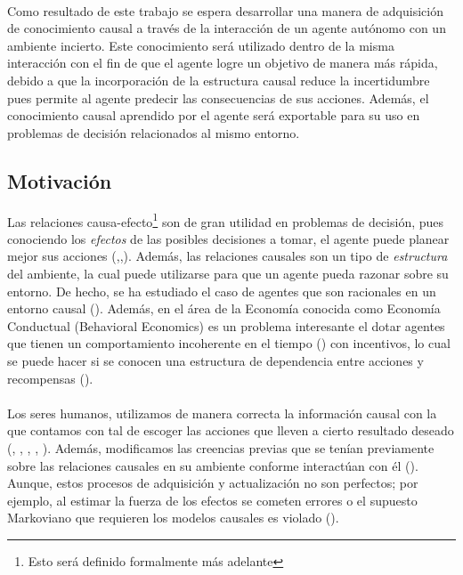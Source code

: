 \documentclass[11pt]{article}
\theoremstyle{plain}
\begin{document}
\\
\indent Como resultado de este trabajo se espera desarrollar una manera de adquisición de conocimiento causal a través de la interacción de un agente autónomo con un ambiente incierto. Este conocimiento será utilizado dentro de la misma interacción con el fin de que el agente logre un objetivo de manera más rápida, debido a que la incorporación de la estructura causal reduce la incertidumbre pues permite al agente predecir las consecuencias de sus acciones. Además, el conocimiento causal aprendido por el agente será exportable para su uso en problemas de decisión relacionados al mismo entorno.
\subsection{Motivación}
Las relaciones causa-efecto\footnote{Esto será definido formalmente más adelante} son de gran utilidad en problemas de decisión, pues conociendo los \textit{efectos} de las posibles decisiones a tomar, el agente puede planear mejor sus acciones (\cite{spirtes2000causation},\cite{hagmayer2013repeated},\cite{pearlwhy}). Además, las relaciones causales son un tipo de \textit{estructura} del ambiente, la cual puede utilizarse para que un agente pueda razonar sobre su entorno. De hecho, se ha estudiado el caso de agentes que son racionales en un entorno causal (\cite{board2006equivalence}). Además, en el área de la Economía conocida como Economía Conductual (Behavioral Economics) es un problema interesante el dotar agentes que tienen un comportamiento incoherente en el tiempo (\cite{kleinberg2014time}) con incentivos, lo cual se puede hacer si se conocen una estructura de dependencia entre acciones y recompensas (\cite{albers2016motivating}). \\
\\
\indent Los seres humanos, utilizamos de manera correcta la información causal con la que contamos con tal de escoger las acciones que lleven a cierto resultado deseado (\cite{sloman2006causal}, \cite{nichols2007decision}, \cite{meder2010observing}, \cite{hagmayer2013repeated}, \cite{danks2014unifying}). Además, modificamos las creencias previas que se tenían previamente sobre las relaciones causales en su ambiente conforme interactúan con él (\cite{hagmayer2013repeated}). Aunque, estos procesos de adquisición y actualización no son perfectos; por ejemplo, al estimar la fuerza de los efectos se cometen errores o el supuesto Markoviano que requieren los modelos causales es violado (\cite{rottman2014reasoning}). \\
\end{document}
